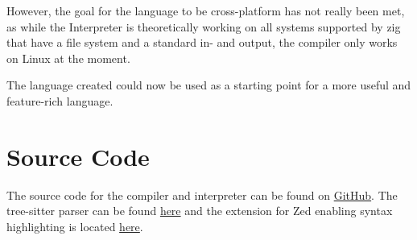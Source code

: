 \documentclass[12pt]{article}
\begin{document}
However, the goal for the language to be cross-platform has not really been met,
as while the Interpreter is theoretically working on all systems supported by zig
that have a file system and a standard in- and output, the compiler only works on
Linux at the moment.

The language created could now be used as a starting point for a more useful and
feature-rich language.

\newpage
\printbibliography

\newpage
\lstlistoflistings
\listoffigures

\newpage
\printglossaries

\appendix

\section{Source Code}
The source code for the compiler and interpreter can be found on
\href{https://github.com/enmiligi/matura-project}{GitHub}.
The tree-sitter parser can be found \href{https://github.com/enmiligi/tree-sitter-imp}{here}
and the extension for Zed enabling syntax highlighting is located \href{https://github.com/enmiligi/zed-imp}{here}.
\end{document}

